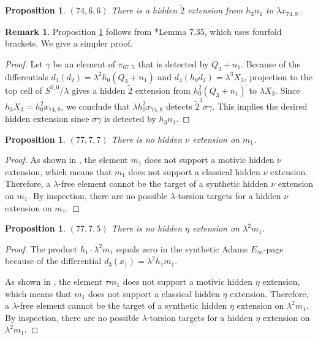 \documentclass{amsart}
\newtheorem{prop}[thm]{Proposition}
\theoremstyle{definition}
\newtheorem{rmk}[thm]{Remark}
\newcommand{\hsf}{\widetilde{2}}
\newcommand{\lemdeg}[1]{$({#1})$}
\begin{document}
\begin{prop}
\label{prop:h-h3n1}
\lemdeg{74, 6, 6}
There is a hidden $\hsf$ extension from $h_3 n_1$ to $\lambda x_{74,8}$.
\end{prop}

\begin{rmk}
Proposition \ref{prop:h-h3n1} follows from \cite{IWX}*{Lemma 7.35}, which uses fourfold
brackets.  We give a simpler proof.
\end{rmk}

\begin{proof}
Let $\gamma$ be an element of $\pi_{67,5}$ that is detected by 
$Q_3 + n_1$.
Because of the differentials $d_3(d_2) = \lambda^2 h_0 (Q_3 + n_1)$
and $d_4(h_0 d_2) = \lambda^3 X_3$,
projection to the top cell of $S^{0,0}/\lambda$ gives a
hidden $\hsf$ extension from $h_0^2 (Q_3 + n_1)$ to $\lambda X_3$.
Since $h_3 X_3 = h_0^2 x_{74,8}$, we conclude that
$\lambda h_0^2 x_{74,8}$ detects $\hsf^3 \sigma \gamma$.
This implies the desired hidden extension since
$\sigma \gamma$ is detected by $h_3 n_1$.
\end{proof}

\begin{prop} \label{prop:nu-m1}
\lemdeg{77,7,7}
There is no hidden $\nu$ extension on $m_1$.
\end{prop}

\begin{proof}
As shown in \cite{IWX}, the element $m_1$ does not support
a motivic hidden $\nu$ extension, which means that $m_1$ does not
support a classical hidden $\nu$ extension.
Therefore, a $\lambda$-free element cannot be the target of a 
synthetic hidden $\nu$ extension on $m_1$.  By inspection, there are no possible
$\lambda$-torsion targets for a hidden $\nu$ extension on $m_1$.
\end{proof}

\begin{prop} \label{prop:eta-L^2m1}
\lemdeg{77,7,5}
There is no hidden $\eta$ extension on $\lambda^2 m_1$.
\end{prop}

\begin{proof}
The product $h_1 \cdot \lambda^2 m_1$ equals zero in the
synthetic Adams $E_\infty$-page because of the differential
$d_3(x_1) = \lambda^2 h_1 m_1$.

As shown in \cite{IWX}, the element $\tau m_1$ does not support a motivic hidden $\eta$ extension, which means that $m_1$ does not support a classical hidden $\eta$ extension.
Therefore, a $\lambda$-free element cannot be the target of a synthetic 
hidden $\eta$ extension on $\lambda^2 m_1$.
By inspection, there are no possible
$\lambda$-torsion targets for a hidden $\eta$ extension on $\lambda^2 m_1$.
\end{proof}
\end{document}
